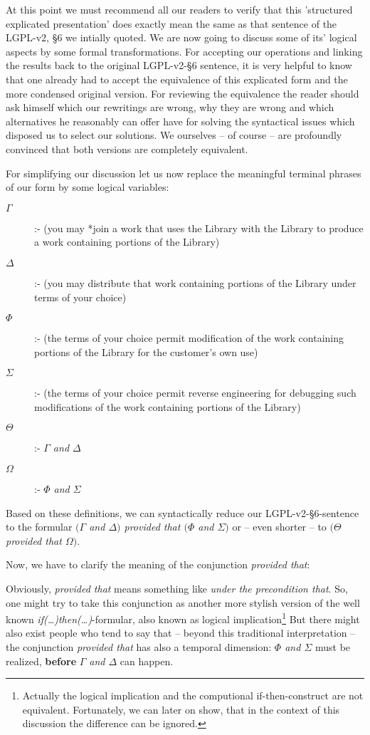 At this point we must recommend all our readers to verify that this 'structured
explicated presentation' does exactly mean the same as that sentence of the
LGPL-v2, §6 we intially quoted. We are now going to discuss some of its' logical
aspects by some formal transformations. For accepting our operations and linking
the results back to the original LGPL-v2-§6 sentence, it is very helpful to know
that one already had to accept the equivalence of this explicated form and the
more condensed original version. For reviewing the equivalence the reader should
ask himself which our rewritings are wrong, why they are wrong and which
alternatives he reasonably can offer have for solving the syntactical issues
which disposed us to select our solutions. We ourselves -- of course -- are
profoundly convinced that both versions are completely equivalent.

For simplifying our discussion let us now replace the meaningful terminal
phrases of our form by some logical variables:

\begin{description}
  \item[$\Gamma$] :- (you may *join a work that uses the Library with the
  Library to produce a work containing portions of the Library) 
  \item[$\Delta$] :- (you may distribute that work containing portions of the
  Library under terms of your choice)
  \item[$\Phi$] :- (the terms of your choice permit modification of the work 
  containing portions of the Library for the customer's own use)
  \item[$\Sigma$] :- (the terms of your choice permit reverse engineering for
  debugging such modifications of the work containing portions of the Library)
  \item[$\Theta$] :- \emph{$\Gamma$ and $\Delta$}
  \item[$\Omega$] :- \emph{$\Phi$ and $\Sigma$}
\end{description}

Based on these definitions, we can syntactically reduce our LGPL-v2-§6-sentence
to the formular \emph{$(\Gamma$ and $\Delta)$ provided that $(\Phi$ and
$\Sigma)$} or -- even shorter -- to \emph{$(\Theta$ provided that
$\Omega)$}.

Now, we have to clarify the meaning of the conjunction \emph{provided that}:

Obviously, \emph{provided that} means something like \emph{under the
precondition that}. So, one might try to take this conjunction as another more
stylish version of the well known \emph{if(\ldots)then(\ldots)}-formular, also
known as logical implication\footnote{Actually the logical implication and the
computional if-then-construct are not equivalent. Fortunately, we can later on
show, that in the context of this discussion the difference can be ignored.} But
there might also exist people who tend to say that -- beyond this traditional
interpretation -- the conjunction \emph{provided that} has also a temporal
dimension: \emph{$\Phi$ and $\Sigma$} must be realized, \textbf{before}
\emph{$\Gamma$ and $\Delta$} can happen.

